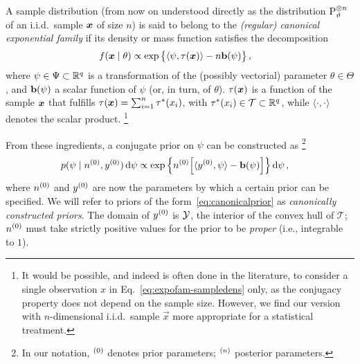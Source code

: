 A sample distribution
(from now on understood directly as the distribution $\operatorname{P}_\vartheta^{\otimes n}$ of an i.i.d.\ sample ${\bm x}$ of size $n$)
is said to belong to the \emph{(regular) canonical exponential family} if its density or mass function satisfies the decomposition
\begin{align}
\label{eq:expofam-sampledens}
f({\bm x} \mid \theta) &\propto \exp\big\{\langle \psi, \tau({\bm x}) \rangle - n \mathbf{b}(\psi)\big\}\,,
\end{align}
where $\psi \in \Psi \subset \mathbb{R}^q$ is a transformation of the (possibly vectorial) parameter $\theta \in \Theta$,
and $\mathbf{b}(\psi)$ a scalar function of $\psi$ (or, in turn, of $\theta$).
$\tau({\bm x})$ is a function of the sample ${\bm x}$ that fulfills $\tau({\bm x}) = \sum_{i=1}^n \tau^*(x_i)$,
with $\tau^*(x_i) \in \mathcal{T} \subset \mathbb{R}^q$,
while $\langle\cdot, \cdot\rangle$ denotes the scalar product.%
\footnote{\label{foot:dataisplural}It would be possible, and indeed is often done in the literature,
to consider a single observation $x$ in Eq.~\eqref{eq:expofam-sampledens} only,
as the conjugacy property does not depend on the sample size.
However, we find our version with $n$-dimensional i.i.d.\ sample $\vec{x}$
more appropriate for a statistical treatment.} %

From these ingredients, a conjugate prior on $\psi$ can be constructed as%
\footnote{In our notation, ${}^{(0)}$ denotes prior parameters; ${}^{(n)}$ posterior parameters.}
\begin{align}
\label{eq:canonicalprior}
p(\psi \mid n^{(0)}, y^{(0)}) \,\mathrm{d}\psi
 &\propto \exp\Big\{ n^{(0)} \Big[ \langle y^{(0)}, \psi \rangle - \mathbf{b}(\psi) \Big] \Big\} \,\mathrm{d}\psi\,,
\end{align}
where $n^{(0)}$ and $y^{(0)}$ are now the parameters by which a certain prior can be specified.
We will refer to priors of the form~\eqref{eq:canonicalprior} as \emph{canonically constructed priors}.
The domain of $y^{(0)}$ is $\mathcal{Y}$, the interior of the convex hull of $\mathcal{T}$;
$n^{(0)}$ must take strictly positive values for the prior to be \emph{proper} (i.e., integrable to $1$).

